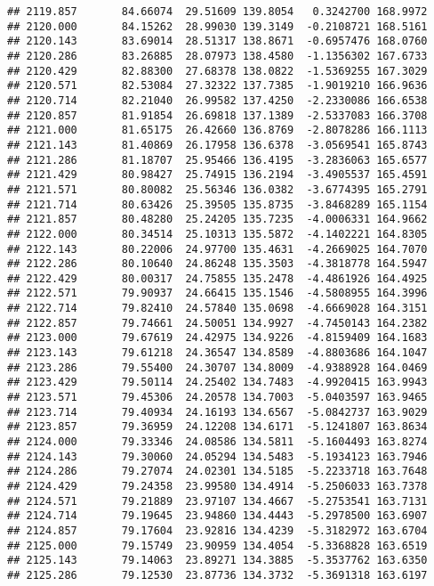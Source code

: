 \documentclass[
]{article}
\begin{document}
\begin{verbatim}
## 2119.857       84.66074  29.51609 139.8054   0.3242700 168.9972
## 2120.000       84.15262  28.99030 139.3149  -0.2108721 168.5161
## 2120.143       83.69014  28.51317 138.8671  -0.6957476 168.0760
## 2120.286       83.26885  28.07973 138.4580  -1.1356302 167.6733
## 2120.429       82.88300  27.68378 138.0822  -1.5369255 167.3029
## 2120.571       82.53084  27.32322 137.7385  -1.9019210 166.9636
## 2120.714       82.21040  26.99582 137.4250  -2.2330086 166.6538
## 2120.857       81.91854  26.69818 137.1389  -2.5337083 166.3708
## 2121.000       81.65175  26.42660 136.8769  -2.8078286 166.1113
## 2121.143       81.40869  26.17958 136.6378  -3.0569541 165.8743
## 2121.286       81.18707  25.95466 136.4195  -3.2836063 165.6577
## 2121.429       80.98427  25.74915 136.2194  -3.4905537 165.4591
## 2121.571       80.80082  25.56346 136.0382  -3.6774395 165.2791
## 2121.714       80.63426  25.39505 135.8735  -3.8468289 165.1154
## 2121.857       80.48280  25.24205 135.7235  -4.0006331 164.9662
## 2122.000       80.34514  25.10313 135.5872  -4.1402221 164.8305
## 2122.143       80.22006  24.97700 135.4631  -4.2669025 164.7070
## 2122.286       80.10640  24.86248 135.3503  -4.3818778 164.5947
## 2122.429       80.00317  24.75855 135.2478  -4.4861926 164.4925
## 2122.571       79.90937  24.66415 135.1546  -4.5808955 164.3996
## 2122.714       79.82410  24.57840 135.0698  -4.6669028 164.3151
## 2122.857       79.74661  24.50051 134.9927  -4.7450143 164.2382
## 2123.000       79.67619  24.42975 134.9226  -4.8159409 164.1683
## 2123.143       79.61218  24.36547 134.8589  -4.8803686 164.1047
## 2123.286       79.55400  24.30707 134.8009  -4.9388928 164.0469
## 2123.429       79.50114  24.25402 134.7483  -4.9920415 163.9943
## 2123.571       79.45306  24.20578 134.7003  -5.0403597 163.9465
## 2123.714       79.40934  24.16193 134.6567  -5.0842737 163.9029
## 2123.857       79.36959  24.12208 134.6171  -5.1241807 163.8634
## 2124.000       79.33346  24.08586 134.5811  -5.1604493 163.8274
## 2124.143       79.30060  24.05294 134.5483  -5.1934123 163.7946
## 2124.286       79.27074  24.02301 134.5185  -5.2233718 163.7648
## 2124.429       79.24358  23.99580 134.4914  -5.2506033 163.7378
## 2124.571       79.21889  23.97107 134.4667  -5.2753541 163.7131
## 2124.714       79.19645  23.94860 134.4443  -5.2978500 163.6907
## 2124.857       79.17604  23.92816 134.4239  -5.3182972 163.6704
## 2125.000       79.15749  23.90959 134.4054  -5.3368828 163.6519
## 2125.143       79.14063  23.89271 134.3885  -5.3537762 163.6350
## 2125.286       79.12530  23.87736 134.3732  -5.3691318 163.6197

\end{verbatim}
\end{document}
